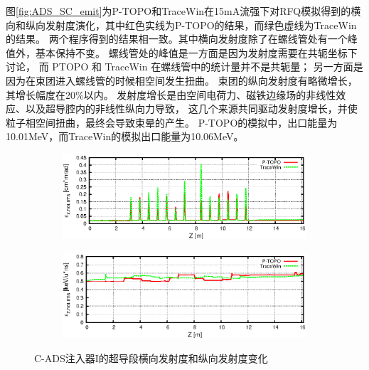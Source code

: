 图\eqref{fig:ADS_SC_emit}为P-TOPO和TraceWin在15mA流强下对RFQ模拟得到的横向和纵向发射度演化，其中红色实线为P-TOPO的结果，而绿色虚线为TraceWin的结果。
两个程序得到的结果相一致。其中横向发射度除了在螺线管处有一个峰值外，基本保持不变。
螺线管处的峰值是一方面是因为发射度需要在共轭坐标下讨论， 而 PTOPO 和 TraceWin 在螺线管中的统计量并不是共轭量；
另一方面是因为在束团进入螺线管的时候相空间发生扭曲。
束团的纵向发射度有略微增长，其增长幅度在20\%以内。
发射度增长是由空间电荷力、磁铁边缘场的非线性效应、以及超导腔内的非线性纵向力导致，
这几个来源共同驱动发射度增长，并使粒子相空间扭曲，最终会导致束晕的产生。
P-TOPO的模拟中，出口能量为10.01MeV，而TraceWin的模拟出口能量为10.06MeV。
\begin{figure}[!htb]
    \centering
    \begin{subfigure}[b]{0.9\textwidth}
        \includegraphics[width=\textwidth]{Img/ADS_SC_emit1.eps}
    \end{subfigure}
    \begin{subfigure}[b]{0.9\textwidth}
        \includegraphics[width=\textwidth]{Img/ADS_SC_emit2.eps}
    \end{subfigure}
    \caption{C-ADS注入器I的超导段横向发射度和纵向发射度变化}\label{fig:ADS_SC_emit}
\end{figure}

